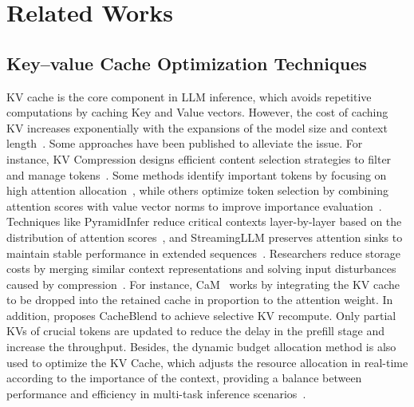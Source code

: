 \section{Related Works}
\subsection{Key--value Cache Optimization Techniques}

KV cache is the core component in LLM inference, which avoids repetitive computations by caching Key and Value vectors. However, the cost of caching KV increases exponentially with the expansions of the model size and context length~\cite{pope2023efficiently}. Some approaches have been published to alleviate the issue. For instance, KV Compression designs efficient content selection strategies to filter and manage tokens~\cite{h2o,adnan2024keyformer}. Some methods identify important tokens by focusing on high attention allocation~\cite{snapkv}, while others optimize token selection by combining attention scores with value vector norms to improve importance evaluation~\cite{guo2024attention}. Techniques like PyramidInfer reduce critical contexts layer-by-layer based on the distribution of attention scores~\cite{yang2024pyramidinfer}, and StreamingLLM preserves attention sinks to maintain stable performance in extended sequences~\cite{streamingllm}. Researchers reduce storage costs by merging similar context representations and solving input disturbances caused by compression~\cite{zhangcam}. For instance, CaM~\cite{zhangcam} works by integrating the KV cache to be dropped into the retained cache in proportion to the attention weight.  In addition, \citet{yao2024cacheblend} proposes CacheBlend to achieve selective KV recompute. Only partial KVs of crucial tokens are updated to reduce the delay in the prefill stage and increase the throughput. Besides, the dynamic budget allocation method is also used to optimize the KV Cache, which adjusts the resource allocation in real-time according to the importance of the context, providing a balance between performance and efficiency in multi-task inference scenarios~\cite{pyramidkv,feng2024ada,chunkkv}.



